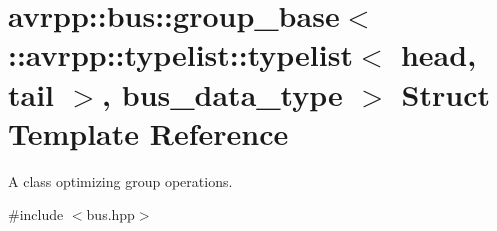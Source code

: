\hypertarget{structavrpp_1_1bus_1_1group__base_3_01_1_1avrpp_1_1typelist_1_1typelist_3_01head_00_01tail_01_4_00_01bus__data__type_01_4}{
\section{avrpp::bus::group\_\-base$<$ ::avrpp::typelist::typelist$<$ head, tail $>$, bus\_\-data\_\-type $>$ Struct Template Reference}
\label{structavrpp_1_1bus_1_1group__base_3_01_1_1avrpp_1_1typelist_1_1typelist_3_01head_00_01tail_01_4_00_01bus__data__type_01_4}
}


A class optimizing group operations.  




{\ttfamily \#include $<$bus.hpp$>$}

